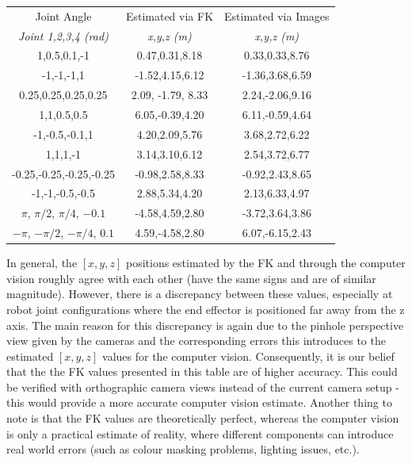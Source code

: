\documentclass[11pt]{article}
\begin{document}
\begin{center}
    \begin{tabular}{|c|c|c|}
        \hline
        Joint Angle & Estimated via FK & Estimated via Images \\
        \textit{Joint 1,2,3,4 (rad)} & \textit{x,y,z (m)} & \textit{x,y,z (m)} \\ \hline
        1,0.5,0.1,-1 & 0.47,0.31,8.18 & 0.33,0.33,8.76 \\
        -1,-1,-1,1 & -1.52,4.15,6.12 & -1.36,3.68,6.59 \\
        0.25,0.25,0.25,0.25 & 2.09, -1.79, 8.33 & 2.24,-2.06,9.16 \\
        1,1,0.5,0.5 & 6.05,-0.39,4.20 & 6.11,-0.59,4.64 \\
        -1,-0.5,-0.1,1 & 4.20,2.09,5.76 & 3.68,2.72,6.22 \\
        1,1,1,-1 & 3.14,3.10,6.12 & 2.54,3.72,6.77 \\
        -0.25,-0.25,-0.25,-0.25 & -0.98,2.58,8.33 & -0.92,2.43,8.65 \\
        -1,-1,-0.5,-0.5 & 2.88,5.34,4.20 & 2.13,6.33,4.97 \\
        \(\pi\), $\pi/2$, $\pi/4$, $-0.1$ & -4.58,4.59,2.80 & -3.72,3.64,3.86 \\
        \(-\pi\), $-\pi/2$, $-\pi/4$, $0.1$ & 4.59,-4.58,2.80 & 6.07,-6.15,2.43 \\
        \hline
    \end{tabular}
\end{center}

In general, the $[x,y,z]$ positions estimated by the FK and through the computer vision roughly agree with each other (have the same signs and are of similar magnitude). However, there is a discrepancy between these values, especially at robot joint configurations where the end effector is positioned far away from the z axis. The main reason for this discrepancy is again due to the pinhole perspective view given by the cameras and the corresponding errors this introduces to the estimated $[x,y,z]$ values for the computer vision. Consequently, it is our belief that the the FK values presented in this table are of higher accuracy. This could be verified with orthographic camera views instead of the current camera setup - this would provide a more accurate computer vision estimate. Another thing to note is that the FK values are theoretically perfect, whereas the computer vision is only a practical estimate of reality, where different components can introduce real world errors (such as colour masking problems, lighting issues, etc.).
\end{document}
